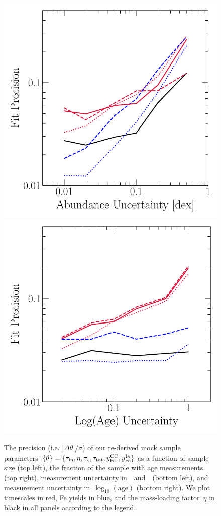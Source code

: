 \documentclass[ms.tex]{subfiles}
\begin{document}
\begin{figure}
\includegraphics[scale = 0.6]{precision_abundanceuncertainty.pdf}
\includegraphics[scale = 0.6]{precision_ageuncertainty.pdf}
\caption{
The precision (i.e. $\left|\Delta \theta\right| / \sigma$) of our re-derived
mock sample parameters~$\{\theta\} = \{\tau_\text{in}, \eta, \tau_\star,
\tau_\text{tot}, y_\text{Fe}^\text{CC}, y_\text{Fe}^\text{Ia}\}$ as a function of sample size (top left),
the fraction of the sample with age measurements (top right), measurement
uncertainty in~\feh~and~\afe~(bottom left), and measurement uncertainty
in~$\log_{10}(\text{age})$ (bottom right).
We plot timescales in red, Fe yields in blue, and the mass-loading
factor~$\eta$ in black in all panels according to the legend.
}
\label{fig:precision}
\end{figure}
\end{document}
